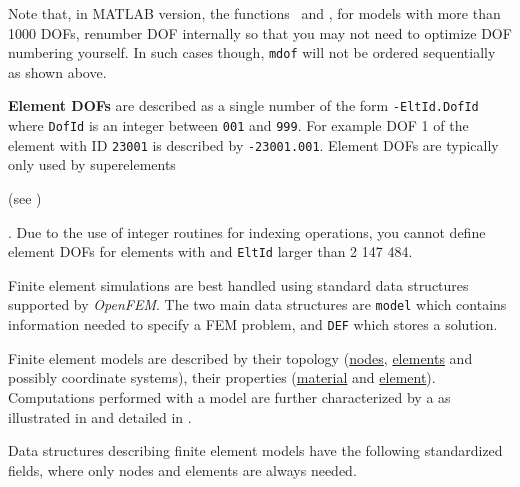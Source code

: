 Note that, in MATLAB version, the functions \feeig\ and \femk, for models with more than 1000 DOFs, renumber DOF internally so that you may not need to optimize DOF numbering yourself. In such cases though, {\tt mdof} will not be ordered sequentially as shown above.


{\bf Element DOFs} are described as a single number of the form {\tt -EltId.DofId} where {\tt DofId} is an integer between {\tt 001} and {\tt 999}.  For example DOF 1 of the element with ID {\tt 23001} is described by {\tt -23001.001}.
Element DOFs are typically only used by superelements \begin{SDT}(see )\end{SDT}. Due to the use of integer routines for indexing operations, you cannot define element DOFs for elements with and {\tt EltId} larger than 2 147 484.


Finite element simulations are best handled using standard data structures supported by {\sl OpenFEM}. The two main data structures are {\tt model} which contains information needed to specify a FEM problem, and {\tt DEF} which stores a solution. 

Finite element models are described by their topology (\hyperlink{node}{nodes}, \hyperlink{elt}{elements} and possibly coordinate systems), their properties (\hyperlink{pl}{material} and \hyperlink{il}{element}). Computations performed with a model are further characterized by a  as illustrated in  and detailed in .

Data structures describing finite element models have the following standardized fields, where only nodes and elements are always needed.

